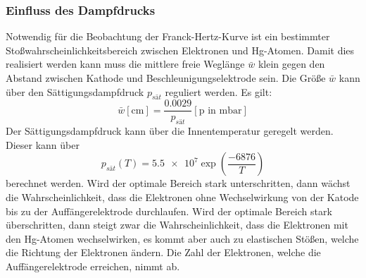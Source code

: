 \subsubsection{Einfluss des Dampfdrucks}
Notwendig für die Beobachtung der Franck-Hertz-Kurve ist ein bestimmter Stoßwahrscheinlichkeitsbereich zwischen Elektronen und Hg-Atomen.
Damit dies realisiert werden kann muss die mittlere freie Weglänge $\bar{w}$ klein gegen den Abstand zwischen Kathode und Beschleunigungselektrode sein.
Die Größe $\bar{w}$ kann über den Sättigungsdampfdruck $p_{sät}$ reguliert werden.
Es gilt:
\begin{equation}
  \label{eq:laeng}
  \bar{w}[\si{\centi\meter}] =\frac{\num{0.0029}}{p_{sät}}[\text{p in } \si{\milli\bar}]
\end{equation}
Der Sättigungsdampfdruck kann über die Innentemperatur geregelt werden.
Dieser kann über
\begin{equation}
  \label{eq:druck}
  p_{sät}(T) = \num{5.5e7} \exp\left(\frac{\num{-6876}}{T}\right)
\end{equation}
berechnet werden.
Wird der optimale Bereich stark unterschritten, dann wächst die Wahrscheinlichkeit, dass die Elektronen ohne Wechselwirkung von der Katode bis zu der Auffängerelektrode durchlaufen.
Wird der optimale Bereich stark überschritten, dann steigt zwar die Wahrscheinlichkeit, dass die Elektronen mit den Hg-Atomen wechselwirken,
es kommt aber auch zu elastischen Stößen, welche die Richtung der Elektronen ändern.
Die Zahl der Elektronen, welche die Auffängerelektrode erreichen, nimmt ab.
